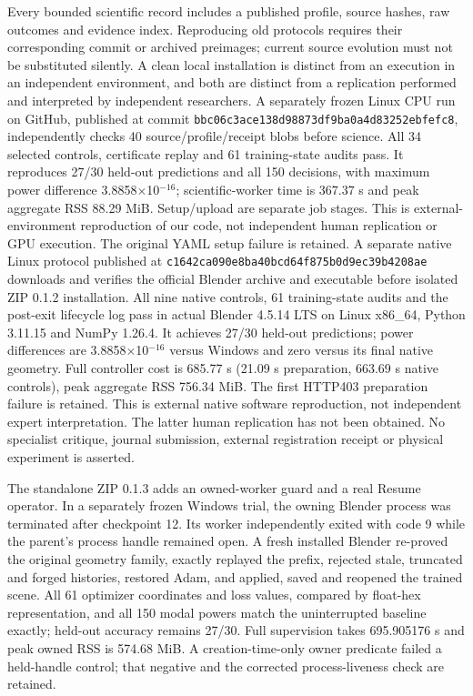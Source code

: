 \documentclass[11pt]{article}
\begin{document}
Every bounded scientific record includes a published profile, source hashes, raw outcomes and evidence index. Reproducing old protocols requires their corresponding commit or archived preimages; current source evolution must not be substituted silently. A clean local installation is distinct from an execution in an independent environment, and both are distinct from a replication performed and interpreted by independent researchers. A separately frozen Linux CPU run on GitHub, published at commit \texttt{bbc06c3ace138d98873df9ba0a4d83252ebfefc8}, independently checks 40 source/profile/receipt blobs before science. All 34 selected controls, certificate replay and 61 training-state audits pass. It reproduces 27/30 held-out predictions and all 150 decisions, with maximum power difference 3.8858$\times$10$^{-16}$; scientific-worker time is 367.37 s and peak aggregate RSS 88.29 MiB. Setup/upload are separate job stages. This is external-environment reproduction of our code, not independent human replication or GPU execution. The original YAML setup failure is retained. A separate native Linux protocol published at \texttt{c1642ca090e8ba40bcd64f875b0d9ec39b4208ae} downloads and verifies the official Blender archive and executable before isolated ZIP 0.1.2 installation. All nine native controls, 61 training-state audits and the post-exit lifecycle log pass in actual Blender 4.5.14 LTS on Linux x86\_64, Python 3.11.15 and NumPy 1.26.4. It achieves 27/30 held-out predictions; power differences are 3.8858$\times$10$^{-16}$ versus Windows and zero versus its final native geometry. Full controller cost is 685.77 s (21.09 s preparation, 663.69 s native controls), peak aggregate RSS 756.34 MiB. The first HTTP403 preparation failure is retained. This is external native software reproduction, not independent expert interpretation. The latter human replication has not been obtained. No specialist critique, journal submission, external registration receipt or physical experiment is asserted.

The standalone ZIP 0.1.3 adds an owned-worker guard and a real Resume operator. In a separately frozen Windows trial, the owning Blender process was terminated after checkpoint 12. Its worker independently exited with code 9 while the parent's process handle remained open. A fresh installed Blender re-proved the original geometry family, exactly replayed the prefix, rejected stale, truncated and forged histories, restored Adam, and applied, saved and reopened the trained scene. All 61 optimizer coordinates and loss values, compared by float-hex representation, and all 150 modal powers match the uninterrupted baseline exactly; held-out accuracy remains 27/30. Full supervision takes 695.905176 s and peak owned RSS is 574.68 MiB. A creation-time-only owner predicate failed a held-handle control; that negative and the corrected process-liveness check are retained.
\end{document}
